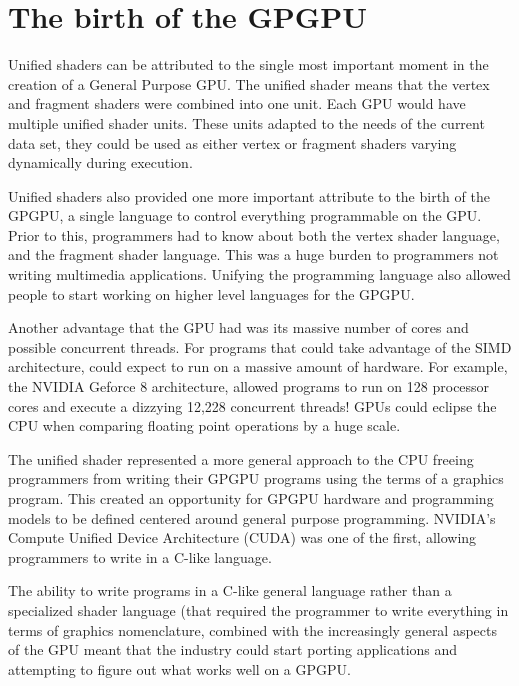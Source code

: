 \section*{The birth of the GPGPU}

Unified shaders can be attributed to the single most important moment in the creation of a General Purpose GPU. The unified shader means that the vertex and fragment shaders were combined into one unit. Each GPU would have multiple unified shader units. These units adapted to the needs of the current data set, they could be used as either vertex or fragment shaders varying dynamically during execution. 

Unified shaders also provided one more important attribute to the birth of the GPGPU, a single language to control everything programmable on the GPU. Prior to this, programmers had to know about both the vertex shader language, and the fragment shader language. This was a huge burden to programmers not writing multimedia applications. Unifying the programming language also allowed people to start working on higher level languages for the GPGPU. \cite{gpucomputing}

Another advantage that the GPU had was its massive number of cores and possible concurrent threads. For programs that could take advantage of the SIMD architecture, could expect to run on a massive amount of hardware. For example, the NVIDIA Geforce 8 architecture, allowed programs to run on 128 processor cores and execute a dizzying 12,228 concurrent threads! GPUs could eclipse the CPU when comparing floating point operations by a huge scale. \cite{emergingtech}

The unified shader represented a more general approach to the CPU freeing programmers from writing their GPGPU programs using the terms of a graphics program. This created an opportunity for GPGPU hardware and programming models to be defined centered around general purpose programming. NVIDIA's Compute Unified Device Architecture (CUDA) was one of the first, allowing programmers to write in a C-like language. 

The ability to write programs in a C-like general language rather than a specialized shader language (that required the programmer to write everything in terms of graphics nomenclature, combined with the increasingly general aspects of the GPU meant that the industry could start porting applications and attempting to figure out what works well on a GPGPU. 

